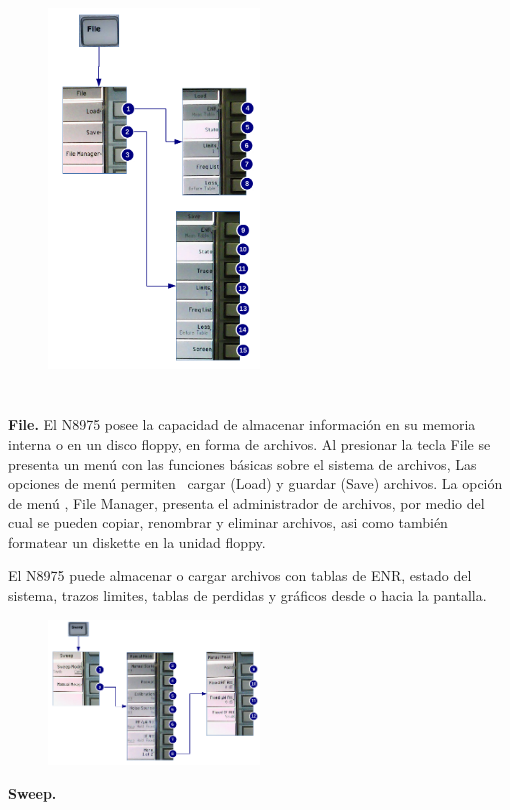 	\begin{minipage}[t][11cm]{\textwidth}
		\begin{figure}		
			\includegraphics[width=0.5\textwidth, height=11cm, keepaspectratio]{./Imagenes/MenuFileN8975A.pdf}	
		\end{figure}		
		\textbf{File.} El N8975 posee la capacidad de almacenar información en su memoria interna o en un disco floppy, en forma de archivos. Al presionar la tecla File se presenta un menú con las funciones básicas sobre el sistema de archivos, Las opciones de menú permiten \ cargar (Load) y guardar (Save) archivos. La opción de menú , File Manager, presenta el administrador de archivos, por medio del cual se pueden copiar, renombrar y eliminar archivos, asi como también formatear un diskette en la unidad floppy.
		
		El N8975 puede almacenar o cargar archivos con tablas de ENR, estado del sistema, trazos limites, tablas de perdidas y gráficos desde o hacia la pantalla. 
	\end{minipage}


	\begin{minipage}[t][10cm]{\textwidth}
		\begin{figure}		
			\centering
			\includegraphics[width=0.5\textwidth]{./Imagenes/MenuSweepN8975A.pdf}	
		\end{figure}
		
		\textbf{Sweep.}		
	\end{minipage}
		
